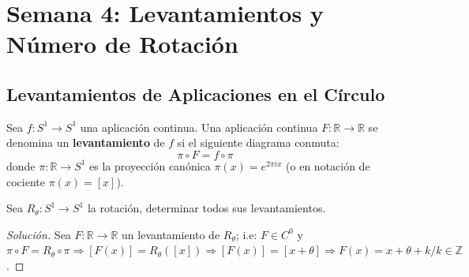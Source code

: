 
\chapter{Semana 4: Levantamientos y Número de Rotación}

\section{Levantamientos de Aplicaciones en el Círculo}

\begin{definicion}[Levantamiento]
	Sea $f: S^1 \to S^1$ una aplicación continua. Una aplicación continua $F: \mathbb{R} \to \mathbb{R}$ se denomina un \textbf{levantamiento} de $f$ si el siguiente diagrama conmuta:
	$$ \pi \circ F = f \circ \pi $$
	donde $\pi: \mathbb{R} \to S^1$ es la proyección canónica $\pi(x) = e^{2\pi i x}$ (o en notación de cociente $\pi(x) = [x]$).
\end{definicion}

\begin{ejercicio}
	Sea $R_\theta: S^1 \to S^1$ la rotación, determinar todos sus levantamientos.
\end{ejercicio}
\begin{proof}[Solución]
	Sea $F: \mathbb{R} \to \mathbb{R}$ un levantamiento de $R_\theta$; i.e: $F \in C^0$ y $\pi \circ F = R_\theta \circ \pi \Rightarrow [F(x)] = R_\theta([x]) \Rightarrow [F(x)] = [x+\theta] \Rightarrow F(x) = x+\theta+k / k \in \mathbb{Z}$.
\end{proof}

